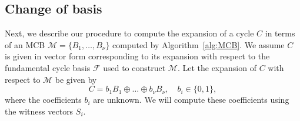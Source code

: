 \documentclass[fleqn,11pt]{article}
\newcommand\calB{\mathcal{B}}
\newcommand\calF{\mathcal{F}}
\newcommand\calM{\mathcal{M}}
\begin{document}



%
%

\subsection{Change of basis}
\label{sub:MCB_COB}



Next, we describe our procedure to compute the expansion of a cycle $C$ in terms of an MCB $\calM=\{B_1,\hdots,B_\nu\}$ computed by Algorithm~\ref{alg:MCB}.
We assume $C$ is given in vector form corresponding to its expansion with respect to the fundamental cycle basis $\calF$ used to construct $\calM$. 
Let the expansion of $C$ with respect to $\calM$ be given by
\begin{equation}
	C = b_1 B_1\oplus\hdots\oplus b_\nu B_\nu,\quad b_i\in\{0,1\},\label{eq:C_exp_MCB_0}
\end{equation}
where the coefficients $b_i$ are unknown.
We will compute these coefficients using the witness vectors $S_i$.%
\end{document}
